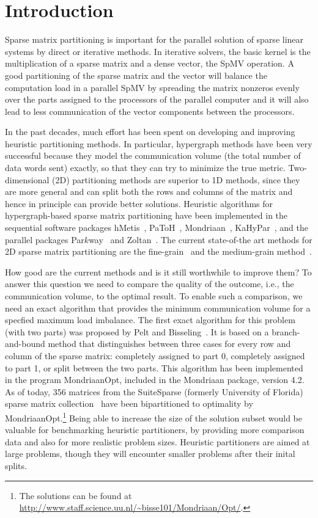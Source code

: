 \section{Introduction}
\label{sec:intro}
Sparse matrix partitioning is important for the parallel solution
of sparse linear systems by direct or iterative methods. In
iterative solvers, the basic kernel is the multiplication of a
sparse matrix and a dense vector, the SpMV operation. A good
partitioning of the sparse matrix and the vector will balance
the computation load in a parallel SpMV by spreading the matrix
nonzeros evenly over the parts assigned to the processors of the
parallel computer and it will also lead to less communication of
the vector components between the processors.

In the past decades, much effort has been spent on developing and
improving heuristic partitioning methods. In particular,
hypergraph methods have been very successful because they model
the communication volume (the total number of data words sent)
exactly, so that they can try to minimize the true metric.
Two-dimensional (2D) partitioning methods are superior to 1D methods,
since they are more general and can split both the rows and columns
of the matrix and hence in principle can provide better solutions.
Heuristic algorithms for hypergraph-based sparse matrix partitioning
have been implemented in the sequential software packages
hMetis~\cite{karypis99b}, PaToH~\cite{catalyurek99},
Mondriaan~\cite{vastenhouw05}, KaHyPar~\cite{akhremtsev17},
and the parallel packages Par$k$way~\cite{trifunovic08} and
Zoltan~\cite{devine06}.
The current state-of-the art methods for 2D sparse matrix
partitioning are the fine-grain~\cite{catalyurek01} and the
medium-grain method~\cite{pelt14}. 

How good are the current methods and is it still worthwhile to
improve them? To answer this question we need to compare the
quality of the outcome, i.e., the communication volume, to the
optimal result. To enable such a comparison, we need an exact
algorithm that provides the minimum communication volume for a
specfied maximum load imbalance. The first exact algorithm
for this problem (with two parts) was proposed by Pelt and
Bisseling~\cite{pelt15}. It is based on a branch-and-bound
method that distinguishes  between three cases for every row
and column of the sparse matrix: completely assigned to part 0,
completely assigned to part 1, or split between the two parts.
This algorithm has been implemented in the program MondriaanOpt,
included in the Mondriaan package, version 4.2. As of today,
356 matrices from the SuiteSparse (formerly University of
Florida) sparse matrix collection~\cite{davis11} have been
bipartitioned to optimality by
MondriaanOpt.\footnote{The solutions can be found at
\url{http://www.staff.science.uu.nl/~bisse101/Mondriaan/Opt/}.}
Being able to increase the size of the solution subset would be
valuable for benchmarking heuristic partitioners, by providing
more comparison data and also for more realistic problem sizes.
Heuristic partitioners are aimed at large problems, though they
will encounter smaller problems after their inital splits.

